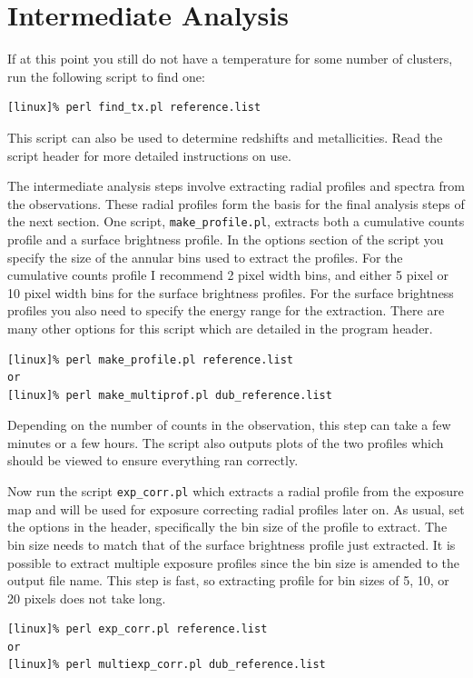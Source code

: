 \section{Intermediate Analysis}

If at this point you still do not have a temperature for some number
of clusters, run the following script to find one:
\begin{verbatim}
[linux]% perl find_tx.pl reference.list
\end{verbatim}
This script can also be used to determine redshifts and
metallicities. Read the script header for more detailed instructions
on use.

The intermediate analysis steps involve extracting radial profiles and
spectra from the observations. These radial profiles form the basis
for the final analysis steps of the next section. One script,
{\tt{make\_profile.pl}}, extracts both a cumulative counts profile and
a surface brightness profile. In the options section of the script you
specify the size of the annular bins used to extract the profiles. For
the cumulative counts profile I recommend 2 pixel width bins, and
either 5 pixel or 10 pixel width bins for the surface brightness
profiles. For the surface brightness profiles you also need to specify
the energy range for the extraction. There are many other options for
this script which are detailed in the program header.
\begin{verbatim}
[linux]% perl make_profile.pl reference.list
or
[linux]% perl make_multiprof.pl dub_reference.list
\end{verbatim}
Depending on the number of counts in the observation, this step can
take a few minutes or a few hours. The script also outputs plots of
the two profiles which should be viewed to ensure everything ran
correctly.

Now run the script {\tt{exp\_corr.pl}} which extracts a radial profile
from the exposure map and will be used for exposure correcting radial
profiles later on. As usual, set the options in the header,
specifically the bin size of the profile to extract. The bin size
needs to match that of the surface brightness profile just
extracted. It is possible to extract multiple exposure profiles since
the bin size is amended to the output file name. This step is fast, so
extracting profile for bin sizes of 5, 10, or 20 pixels does not take
long.
\begin{verbatim}
[linux]% perl exp_corr.pl reference.list
or
[linux]% perl multiexp_corr.pl dub_reference.list
\end{verbatim}

